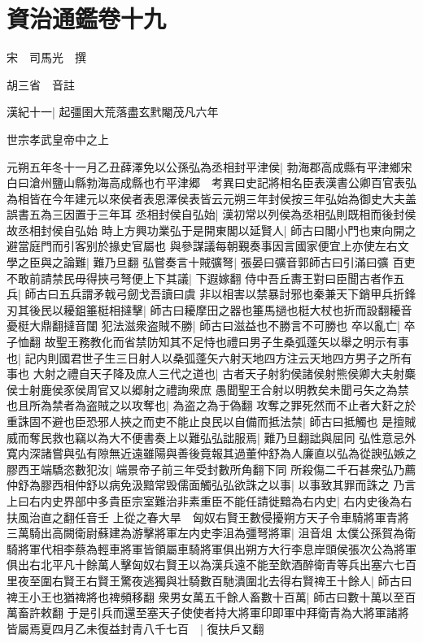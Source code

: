 \section{資治通鑑卷十九}
宋　司馬光　撰

胡三省　音註

漢紀十一|{
	起彊圉大荒落盡玄黓閹茂凡六年}


世宗孝武皇帝中之上

元朔五年冬十一月乙丑薛澤免以公孫弘為丞相封平津侯|{
	勃海郡高成縣有平津鄉宋白曰滄州鹽山縣勃海高成縣也冇平津郷　考異曰史記將相名臣表漢書公卿百官表弘為相皆在今年建元以來侯者表恩澤侯表皆云元朔三年封侯按三年弘始為御史大夫盖誤書五為三因置于三年耳}
丞相封侯自弘始|{
	漢初常以列侯為丞相弘則既相而後封侯故丞相封侯自弘始}
時上方興功業弘于是開東閣以延賢人|{
	師古曰閣小門也東向開之避當庭門而引客别於掾史官屬也}
與參謀議每朝覲奏事因言國家便宜上亦使左右文學之臣與之論難|{
	難乃旦翻}
弘嘗奏言十賊彍弩|{
	張晏曰彍音郭師古曰引滿曰彍}
百吏不敢前請禁民毋得挾弓弩便上下其議|{
	下遐嫁翻}
侍中吾丘夀王對曰臣聞古者作五兵|{
	師古曰五兵謂矛戟弓劒戈吾讀曰虞}
非以相害以禁暴討邪也秦兼天下銷甲兵折鋒刃其後民以耰鉏箠梃相撻擊|{
	師古曰耰摩田之器也箠馬撾也梃大杖也折而設翻耰音憂梃大鼎翻撻音闥}
犯法滋衆盗賊不勝|{
	師古曰滋益也不勝言不可勝也}
卒以亂亡|{
	卒子恤翻}
故聖王務教化而省禁防知其不足恃也禮曰男子生桑弧蓬矢以舉之明示有事也|{
	記内則國君世子生三日射人以桑弧蓬矢六射天地四方注云天地四方男子之所有事也}
大射之禮自天子降及庶人三代之道也|{
	古者天子射豹侯諸侯射熊侯卿大夫射麋侯士射鹿侯豕侯周官又以郷射之禮詢衆庶}
愚聞聖王合射以明教矣未聞弓矢之為禁也且所為禁者為盗賊之以攻奪也|{
	為盗之為于偽翻}
攻奪之罪死然而不止者大姧之於重誅固不避也臣恐邪人挾之而吏不能止良民以自備而抵法禁|{
	師古曰抵觸也}
是擅賊威而奪民救也竊以為大不便書奏上以難弘弘詘服焉|{
	難乃旦翻詘與屈同}
弘性意忌外寛内深諸嘗與弘有隙無近遠雖陽與善後竟報其過董仲舒為人廉直以弘為從諛弘嫉之膠西王端驕恣數犯汝|{
	端景帝子前三年受封數所角翻下同}
所殺傷二千石甚衆弘乃薦仲舒為膠西相仲舒以病免汲黯常毁儒面觸弘弘欲誅之以事|{
	以事致其罪而誅之}
乃言上曰右内史界部中多貴臣宗室難治非素重臣不能任請徙黯為右内史|{
	右内史後為右扶風治直之翻任音壬}
上從之春大旱　匈奴右賢王數侵擾朔方天子令車騎將軍青將三萬騎出高闕衛尉蘇建為游擊將軍左内史李沮為彊弩將軍|{
	沮音俎}
太僕公孫賀為衛騎將軍代相李蔡為輕車將軍皆領屬車騎將軍俱出朔方大行李息岸頭侯張次公為將軍俱出右北平凡十餘萬人擊匈奴右賢王以為漢兵遠不能至飲酒醉衛青等兵出塞六七百里夜至圍右賢王右賢王驚夜逃獨與壮騎數百馳潰圍北去得右賢禆王十餘人|{
	師古曰禆王小王也猶禆將也禆頻移翻}
衆男女萬五千餘人畜數十百萬|{
	師古曰數十萬以至百萬畜許敕翻}
于是引兵而還至塞天子使使者持大將軍印即軍中拜衛青為大將軍諸將皆屬焉夏四月乙未復益封青八千七百　|{
	復扶戶又翻}
